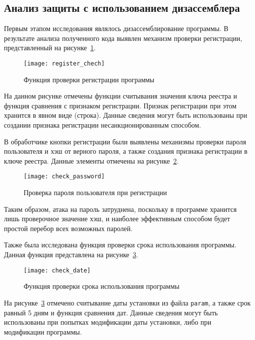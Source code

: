 \subsection{Анализ защиты с использованием дизассемблера}
\label{sec:--5}

Первым этапом исследования являлось дизассемблирование программы. В
результате анализа полученного кода выявлен механизм проверки
регистрации, представленный на рисунке~\ref{fig:4}.

\begin{figure}[h!]
  \centering
  \texttt{[image: register\_chech]}
  \caption{Функция проверки регистрации программы}
  \label{fig:4}
\end{figure}

На данном рисунке отмечены функции считывания значения ключа реестра и
функция сравнения с признаком регистрации. Признак регистрации при
этом хранится в явном виде (строка). Данные сведения могут быть
использованы при создании признака регистрации несанкционированным
способом.

В обработчике кнопки регистрации были выявлены механизмы проверки
пароля пользователя и хэш от верного пароля, а также создания признака
регистрации в ключе реестра. Данные элементы отмечены на
рисунке~\ref{fig:5}.

\begin{figure}[h!]
  \centering
  \texttt{[image: check\_password]}
  \caption{Проверка пароля пользователя при регистрации}
  \label{fig:5}
\end{figure}

Таким образом, атака на пароль затруднена, поскольку в программе
хранится лишь проверочное значение хэш, и наиболее эффективным
способом будет простой перебор всех возможных паролей.  

Также была исследована функция проверки срока использования
программы. Данная функция представлена на рисунке~\ref{fig:6}.

\begin{figure}[h!]
  \centering
  \texttt{[image: check\_date]}
  \caption{Функция проверки срока использования программы}
  \label{fig:6}
\end{figure}

На рисунке~\ref{fig:6} отмечено считывание даты установки из файла
\texttt{param}, а также срок равный 5 дням и функция сравнения
дат. Данные сведения могут быть использованы при попытках модификации
даты установки, либо при модификации программы.

